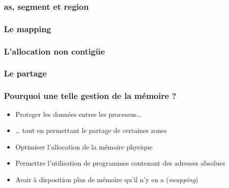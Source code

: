 
\begin{frame}
  \frametitle{as, segment et region}

  \begin{center}
  \end{center}
\end{frame}


\begin{frame}
  \frametitle{Le mapping}

  \begin{center}
  \end{center}
\end{frame}


\begin{frame}
  \frametitle{L'allocation non contig\"{u}e}

  \begin{center}
  \end{center}
\end{frame}


\begin{frame}
  \frametitle{Le partage}

  \begin{center}
  \end{center}
\end{frame}


\begin{frame}
  \frametitle{Pourquoi une telle gestion de la m\'{e}moire ?}

  \begin{itemize}
  \item
    Proteger les donn\'{e}es entres les processus\ldots
  \item
    \ldots{} tout en permettant le partage de certaines zones
  \item
    Optimiser l'allocation de la m\'{e}moire physique
  \item
    Permettre l'utilisation de programmes contenant des adresses absolues
  \item
    Avoir \`{a} disposition plus de m\'{e}moire qu'il n'y en a (\emph{swapping})
  \end{itemize}

\end{frame}

